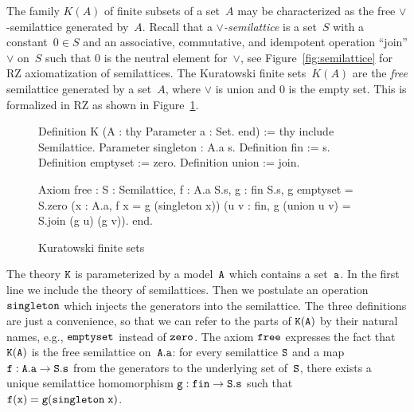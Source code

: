 \else
%
The family $K(A)$ of finite subsets of a set~$A$ may be characterized
as the free $\vee$-semilattice generated by~$A$.
%
\fi
%
Recall that a \emph{$\vee$-semilattice} is a set~$S$ with a
constant~$0 \in S$ and an associative, commutative, and idempotent
operation ``join'' $\vee$ on~$S$ such that $0$ is the neutral element
for~$\vee$, see Figure~\ref{fig:semilattice} for RZ axiomatization of
semilattices.
%
The Kuratowski finite sets~$K(A)$ are the \emph{free} semilattice
generated by a set~$A$, where $\vee$ is union and $0$ is the empty
set. This is formalized in RZ as shown in Figure~\ref{fig:kuratowski}.
%
\begin{figure}
\begin{source}
Definition K (A : thy 
                    Parameter a : Set.
                  end) :=
thy
  include Semilattice.
  Parameter singleton : A.a \iTo s.
  Definition fin := s.
  Definition emptyset := zero.
  Definition union := join.

  Axiom free :
    \iForall S : Semilattice, \iForall f : A.a \iTo S.s,
    \iExistsOne g : fin \iTo S.s, 
      g emptyset = S.zero \iAnd
        (\iForall x : A.a, f x = g (singleton x)) \iAnd
        (\iForall u v : fin, g (union u v) = S.join (g u) (g v)).
end.    
\end{source}
  \caption{Kuratowski finite sets}
  \label{fig:kuratowski}
\end{figure}
%
The theory $\mathtt{K}$ is parameterized by a model~$\mathtt{A}$ which contains a
set~$\mathtt{a}$. In the first line we include the theory of semilattices.
Then we postulate an operation $\mathtt{singleton}$ which injects the
generators into the semilattice. The three definitions are just a
convenience, so that we can refer to the parts of $\mathtt{K(A)}$ by their
natural names, e.g., $\mathtt{emptyset}$ instead of $\mathtt{zero}$. The axiom
$\mathtt{free}$ expresses the fact that $\mathtt{K}(\mathtt{A})$ is the free
semilattice on~$\mathtt{A.a}$: for every semilattice $\mathtt{S}$ and a map
$\mathtt{f} : \mathtt{A.a} \to \mathtt{S.s}$ from the generators to the underlying
set of~$\mathtt{S}$, there exists a unique semilattice homomorphism $\mathtt{g}
: \mathtt{fin} \to \mathtt{S.s}$ such that $\mathtt{f}(\mathtt{x}) = \mathtt{g}(\mathtt{singleton\;
  x})$.

